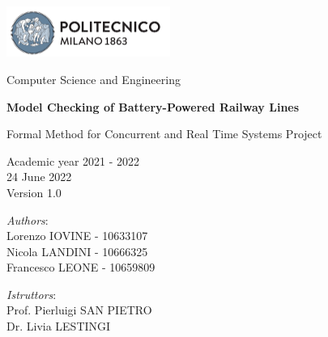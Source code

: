 
\usepackage{listings}





{\begin{titlepage}
     \begin{center}
         \includegraphics[width=0.4\textwidth]{images/PolimiLogo.png}

         \vspace{0.2cm}

         \Large Computer Science and Engineering

         \vspace{0.9cm}

         \Huge \textbf{Model Checking of Battery-Powered Railway Lines}

         \vspace{0.7cm}
         \huge Formal Method for Concurrent and Real Time Systems Project

         \vspace{1.5cm}
         \Large Academic year 2021 - 2022\\
         \vspace{1cm}
         24 June 2022\\Version 1.0
         \vspace{3cm}

         \large
         \begin{minipage}{.1\textwidth}
             \null
         \end{minipage}%
         \begin{minipage}{.4\textwidth}
             \textit{Authors}:\\
             Lorenzo IOVINE - 10633107\\
             Nicola LANDINI - 10666325\\
             Francesco LEONE - 10659809
         \end{minipage}%
         \begin{minipage}{.4\textwidth}
             \raggedleft
             \textit{Istruttors}:\\
             Prof. Pierluigi SAN PIETRO\\
             Dr. Livia LESTINGI\\
             \phantom{placeholder}
         \end{minipage}%
         \begin{minipage}{.1\textwidth}
             \null
         \end{minipage}


     \end{center}
\end{titlepage}}~\\

